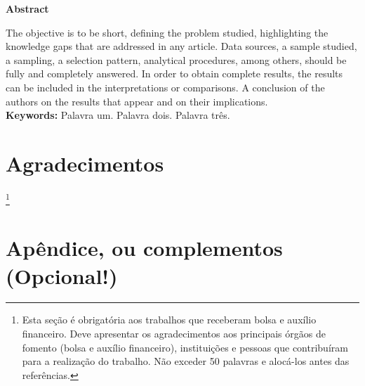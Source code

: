 \documentclass{modelo}
\newcommand{\palavraschave}{Palavra um. Palavra dois. Palavra três.}
\newcommand{\agradecimentosTexto}{Esta seção é obrigatória aos trabalhos que receberam bolsa e auxílio financeiro. Deve apresentar os agradecimentos aos principais órgãos de fomento (bolsa e auxílio financeiro), instituições e pessoas que contribuíram para a realização do trabalho. Não exceder 50 palavras e alocá-los antes das referências.}
\newcommand{\resumoingles}{
	The objective is to be short, defining the problem studied, highlighting the knowledge gaps that are addressed in any article.
	Data sources, a sample studied, a sampling, a selection pattern, analytical procedures, among others, should be fully and completely answered. In order to obtain complete results, the results can be included in the interpretations or comparisons. A conclusion of the authors on the results that appear and on their implications.}
\begin{document}
\newpage  

\begin{center}
\textbf{\large{Abstract}}
\end{center} 
\noindent \resumoingles \\
\textbf{Keywords:}  
\palavraschave
\section*{Agradecimentos}
\thanks{\agradecimentosTexto}  

 


\appendix
\section*{Apêndice, ou complementos (Opcional!)}\label{apendiceA}
\end{document}
